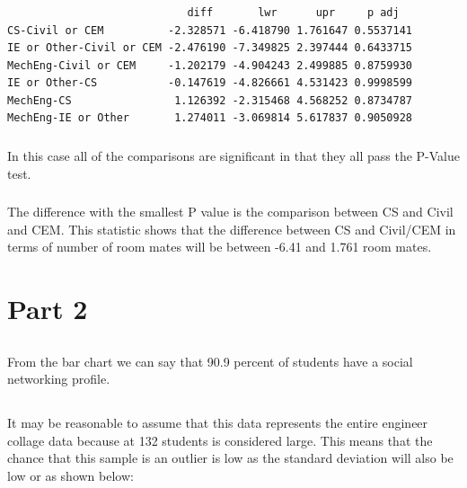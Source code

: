 \documentclass[letterpaper, onecolumn,10pt]{IEEEtran}
\begin{document}
                \subsubsection{}
                    \begin{lstlisting}
                            diff       lwr      upr     p adj
CS-Civil or CEM          -2.328571 -6.418790 1.761647 0.5537141
IE or Other-Civil or CEM -2.476190 -7.349825 2.397444 0.6433715
MechEng-Civil or CEM     -1.202179 -4.904243 2.499885 0.8759930
IE or Other-CS           -0.147619 -4.826661 4.531423 0.9998599
MechEng-CS                1.126392 -2.315468 4.568252 0.8734787
MechEng-IE or Other       1.274011 -3.069814 5.617837 0.9050928
                    \end{lstlisting}
                
                \subsubsection{}
                In this case all of the comparisons are significant in that they all pass the P-Value test.\\
                
                \subsubsection{}
                    The difference with the smallest P value is the comparison between CS and Civil and CEM. This statistic shows that the difference between CS and Civil/CEM in terms of number of room mates will be between -6.41 and 1.761 room mates.\\
        \section{Part 2}
            \subsection{}
            From the bar chart we can say that 90.9 percent of students have a social networking profile.\\
            \subsection{}
            It may be reasonable to assume that this data represents the entire engineer collage data because at 132 students is considered large. This means that the chance that this sample is an outlier is low as the standard deviation will also be low or as shown below:
            
\end{document}
